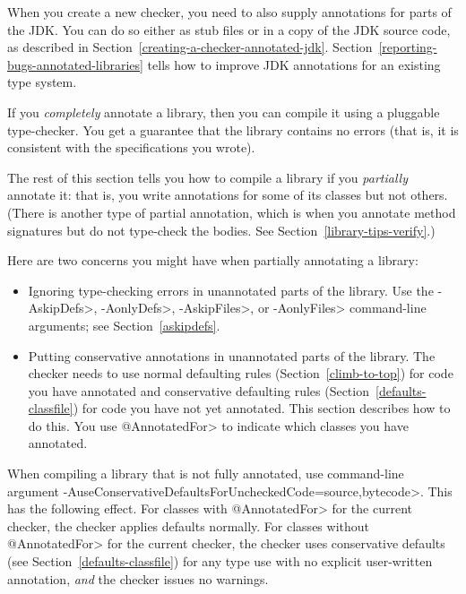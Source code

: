 
When you create a new checker, you need to also supply annotations for
parts of the JDK\@.  You can do so either as stub files or in a copy of the
JDK source code, as described in Section~\ref{creating-a-checker-annotated-jdk}.
Section~\ref{reporting-bugs-annotated-libraries} tells how to improve
JDK annotations for an existing type system.



If you \emph{completely} annotate a library, then you can compile it using a
pluggable type-checker.  You get a guarantee that the library contains no
errors (that is, it is consistent with the specifications you wrote).

The rest of this section tells you how to compile a library if you
\emph{partially} annotate it:  that is, you write annotations for some of its
classes but not others.
(There is another type of partial annotation, which is when you annotate
method signatures but do not type-check the bodies.
See Section~\ref{library-tips-verify}.)

Here are two concerns you might have when partially annotating a library:

\begin{itemize}
\item
  Ignoring type-checking errors in unannotated parts of the library.
  Use the \<-AskipDefs>, \<-AonlyDefs>, \<-AskipFiles>, or \<-AonlyFiles>
  command-line arguments; see
  Section~\ref{askipdefs}.

\item
  Putting conservative annotations in unannotated parts of the library.
  The checker needs to use normal defaulting rules
  (Section~\ref{climb-to-top}) for code you have annotated and conservative
  defaulting rules (Section~\ref{defaults-classfile}) for code you have not
  yet annotated.  This section describes how to do this.  You use
  \<@AnnotatedFor> to indicate which classes you have annotated.
\end{itemize}




\begin{sloppypar}
When compiling a library that is not fully annotated, use command-line
argument \<-AuseConservativeDefaultsForUncheckedCode=source,bytecode>.
This has the following effect.
For classes with \<@AnnotatedFor> for the current checker,
the checker applies defaults normally.
For classes without \<@AnnotatedFor> for the current checker,
the checker uses conservative defaults
(see Section~\ref{defaults-classfile}) for any type use with no explicit
user-written annotation, \emph{and} the checker issues no warnings.
\end{sloppypar}

